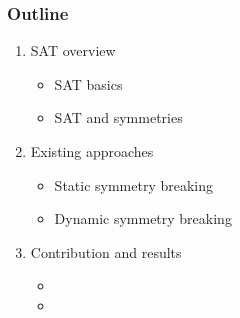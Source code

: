 \documentclass{beamer}
\begin{document}

\begin{frame}
\frametitle{Outline}
\begin{enumerate}
	\item \textcolor{UPMCEngagementBlueB}{SAT overview}
	\begin{itemize}
		\item[] SAT basics
		\item[] SAT and symmetries
	\end{itemize}
	\vspace{5pt}
	\item \textcolor{UPMCEngagementBlueB}{Existing approaches}
	\begin{itemize}
		\item[] Static symmetry breaking
		\item[] Dynamic symmetry breaking
	\end{itemize}
	\vspace{5pt}
	\item \textcolor{UPMCEngagementBlueB}{Contribution and results} 
	\begin{itemize}
		\item[] \phantom{CDCL [Sym]}
		\item[] \phantom{Combination of different approaches}
	\end{itemize}
\end{enumerate}
\end{frame}
\end{document}
